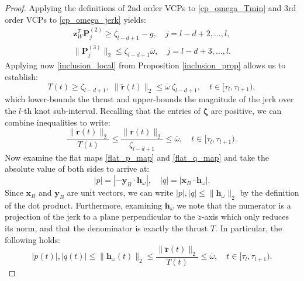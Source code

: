 \documentclass[journal,10pt]{IEEEtran}
\newcommand{\vect}[1]{\boldsymbol{\mathbf{#1}}}
\begin{document}
\begin{proof}
Applying the definitions of $2$nd order VCPs to \eqref{cp_omega_Tmin} and $3$rd order VCPs to \eqref{cp_omega_jerk} yields:
\begin{subequations}
\begin{align}
    \vect{z}_W^T\vect{P}_{j}^{(2)}\geq \zeta_{l-d+1}-g,  \quad j = l-d+2,\dots,l,\label{vcp_omega_Tmin}\\
    \|\vect{P}^{(3)}_j\|_2\leq \zeta_{l-d+1}\overline{\omega},\quad j = l-d+3,\dots,l.\label{vcp_omega_jerk}
\end{align}
\end{subequations}
Applying now \eqref{inclusion_local} from Proposition \ref{inclusion_prop} allows us to establish:
\begin{equation}\label{dang_bounds_lax_local}
T(t) \geq \zeta_{l-d+1},\; \|\dddot{\vect{r}}(t)\|_2 \leq \overline{\omega}\ \zeta_{l-d+1}, \quad t\in[\tau_l,\tau_{l+1}),
\end{equation}
which lower-bounds the thrust and upper-bounds the magnitude of the jerk over the $l$-th knot sub-interval. Recalling that the entries of $\vect{\zeta}$ are positive, we can combine inequalities to write:
\begin{equation*}
    \frac{\|\dddot{\vect{r}}(t)\|_2}{T(t)}\leq\frac{\|\dddot{\vect{r}}(t)\|_2}{\zeta_{l-d+1}}\leq \overline{\omega},\quad t\in[\tau_l,\tau_{l+1}). 
\end{equation*}
Now examine the flat maps \eqref{flat_p_map} and \eqref{flat_q_map} and take the absolute value of both sides to arrive at:
\begin{equation*}
    |p| = |-\vect{y}_B\cdot\vect{h}_{\omega}|, \quad
    |q| = |\vect{x}_B\cdot\vect{h}_{\omega}|.
\end{equation*}
Since $\vect{x}_B$ and $\vect{y}_B$ are unit vectors, we can write $|p|,|q|\leq \|\vect{h}_{\omega}\|_2$ by the definition of the dot product. Furthermore, examining $\vect{h}_{\omega}$ we note that the numerator is a projection of the jerk to a plane perpendicular to the $\ddot{z}$-axis which only reduces its norm, and that the denominator is exactly the thrust $T$. In particular, the following holds:
\begin{equation*}
    |p(t)|,|q(t)|\leq \|\vect{h}_{\omega}(t)\|_2\leq \frac{\|\dddot{\vect{r}}(t)\|_2}{T(t)}\leq \overline{\omega}, \quad  t\in[\tau_l,\tau_{l+1}).

\end{equation*}
\end{proof}
\end{document}
